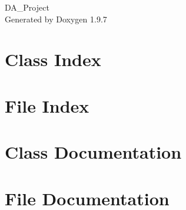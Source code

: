 \documentclass[twoside]{book}
\newcommand{\+}{\discretionary{\mbox{\scriptsize$\hookleftarrow$}}{}{}}
\newcommand{\clearemptydoublepage}{%
    \newpage{\pagestyle{empty}\cleardoublepage}%
  }
\begin{document}
  \raggedbottom
    \hypersetup{pageanchor=false,
                bookmarksnumbered=true,
                pdfencoding=unicode
               }
  \begin{titlepage}
  \vspace*{7cm}
  \begin{center}%
  {\Large DA\+\_\+\+Project}\\
  \vspace*{1cm}
  {\large Generated by Doxygen 1.9.7}\\
  \end{center}
  \end{titlepage}
  \clearemptydoublepage
  \tableofcontents
  \clearemptydoublepage
  \hypersetup{pageanchor=true}
\chapter{Class Index}

\chapter{File Index}

\chapter{Class Documentation}





\chapter{File Documentation}












  \backmatter
  \newpage
  \clearemptydoublepage
  \printindex
\end{document}
